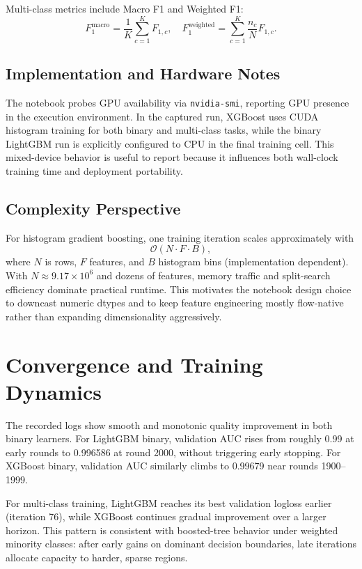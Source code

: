 \documentclass[10pt,journal]{IEEEtran}
\begin{document}
Multi-class metrics include Macro F1 and Weighted F1:
\begin{equation}
F_1^{\text{macro}} = \frac{1}{K}\sum_{c=1}^{K} F_{1,c},\quad
F_1^{\text{weighted}} = \sum_{c=1}^{K} \frac{n_c}{N}F_{1,c}.
\end{equation}

\subsection{Implementation and Hardware Notes}
The notebook probes GPU availability via \texttt{nvidia-smi}, reporting GPU presence in the execution environment. In the captured run, XGBoost uses CUDA histogram training for both binary and multi-class tasks, while the binary LightGBM run is explicitly configured to CPU in the final training cell. This mixed-device behavior is useful to report because it influences both wall-clock training time and deployment portability.

\subsection{Complexity Perspective}
For histogram gradient boosting, one training iteration scales approximately with
\begin{equation}
\mathcal{O}(N\cdot F\cdot B),
\end{equation}
where $N$ is rows, $F$ features, and $B$ histogram bins (implementation dependent). With $N \approx 9.17\times 10^6$ and dozens of features, memory traffic and split-search efficiency dominate practical runtime. This motivates the notebook design choice to downcast numeric dtypes and to keep feature engineering mostly flow-native rather than expanding dimensionality aggressively.

\section{Convergence and Training Dynamics}
The recorded logs show smooth and monotonic quality improvement in both binary learners. For LightGBM binary, validation AUC rises from roughly 0.99 at early rounds to 0.996586 at round 2000, without triggering early stopping. For XGBoost binary, validation AUC similarly climbs to 0.99679 near rounds 1900--1999.

For multi-class training, LightGBM reaches its best validation logloss earlier (iteration 76), while XGBoost continues gradual improvement over a larger horizon. This pattern is consistent with boosted-tree behavior under weighted minority classes: after early gains on dominant decision boundaries, late iterations allocate capacity to harder, sparse regions.
\end{document}
